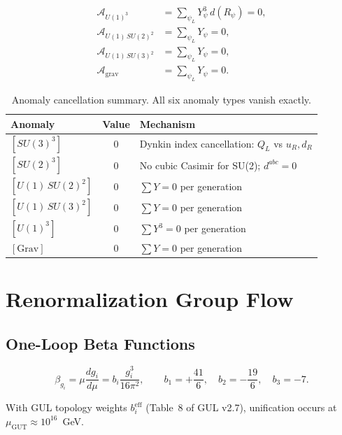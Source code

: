 \documentclass[11pt]{article}
\begin{document}
\begin{align}
  \mathcal{A}_{U(1)^3}
    &= \sum_{\psi_L} Y_\psi^3\,d(R_\psi) = 0, \\
  \mathcal{A}_{U(1)\,SU(2)^2}
    &= \sum_{\psi_L} Y_\psi = 0, \\
  \mathcal{A}_{U(1)\,SU(3)^2}
    &= \sum_{\psi_L} Y_\psi = 0, \\
  \mathcal{A}_\text{grav}
    &= \sum_{\psi_L} Y_\psi = 0.
\end{align}

\begin{table}[htbp]
\centering
\caption{Anomaly cancellation summary. All six anomaly types
vanish exactly.}
\label{tab:anomaly}
\begin{tabular}{@{}lcl@{}}
\toprule
Anomaly & Value & Mechanism \\
\midrule
$[SU(3)^3]$ & $0$ & Dynkin index cancellation: $Q_L$ vs $u_R,d_R$ \\
$[SU(2)^3]$ & $0$ & No cubic Casimir for SU(2); $d^{abc}=0$ \\
$[U(1)\,SU(2)^2]$ & $0$ & $\sum Y=0$ per generation \\
$[U(1)\,SU(3)^2]$ & $0$ & $\sum Y=0$ per generation \\
$[U(1)^3]$ & $0$ & $\sum Y^3=0$ per generation \\
$[\mathrm{Grav}]$ & $0$ & $\sum Y=0$ per generation \\
\bottomrule
\end{tabular}
\end{table}

\section{Renormalization Group Flow}
\label{sec:rg}

\subsection{One-Loop Beta Functions}

\begin{equation}
  \beta_{g_i}
  = \mu\frac{dg_i}{d\mu}
  = b_i\frac{g_i^3}{16\pi^2},
  \qquad
  b_1=+\frac{41}{6},\quad
  b_2=-\frac{19}{6},\quad
  b_3=-7.
\end{equation}

With GUL topology weights $b_i^\text{eff}$ (Table~8 of
GUL v2.7), unification occurs at $\mu_\text{GUT}\approx10^{16}$~GeV.
\end{document}
